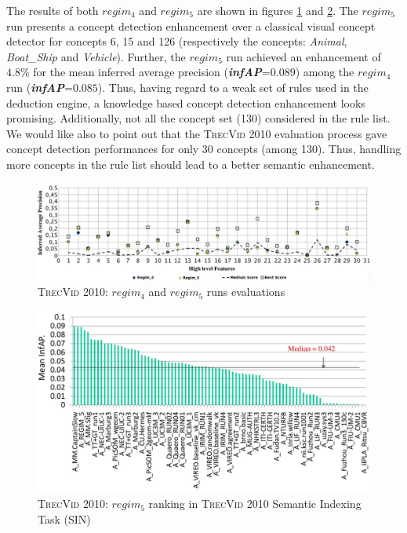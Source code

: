		The results of both $regim_{4}$ and $regim_{5}$ are shown in figures \ref{res1tervcid2010} and
		\ref{trecvid20102}.
		The $regim_{5}$ run presents a concept detection enhancement over a classical visual concept 
		detector for concepts 6,  15 and 126 (respectively the concepts: \textit{Animal}, \textit{Boat\_Ship} and  
		\textit{Vehicle}). Further, the \textit{$regim_{5}$} run achieved an enhancement of $4.8\%$ for the mean inferred average
		precision (\textit{\textbf{infAP}}=$0.089$) among the \textit{$regim_{4}$} run (\textit{\textbf{infAP}}=$0.085$).
		Thus, having regard to a weak set of rules used in the deduction engine, 
		a knowledge based concept detection enhancement looks promising. Additionally, not all the concept set (130) 
		 considered in the rule list. 
		We would like also to point out that the \textsc{TrecVid 2010} evaluation process
		gave concept detection performances for only 30 concepts (among 130). 
		Thus, handling more concepts in the rule list should lead to a better semantic enhancement.

		\begin{figure}[ht!]	
			\centering
			\includegraphics[width=\textwidth]{graphics/trecvid3}
			\caption{\textsc{TrecVid 2010}: $regim_{4}$ and $regim_{5}$ runs evaluations}
			\label{res1tervcid2010}
		\end{figure}

		\begin{figure}[ht]
			\centering
			\includegraphics[scale=0.4]{figures/trecvid2010_2}
			\caption{\textsc{TrecVid 2010}: $regim_{5}$ ranking in  \textsc{TrecVid 2010} Semantic Indexing Task (SIN)}
			\label{trecvid20102}
		\end{figure}



